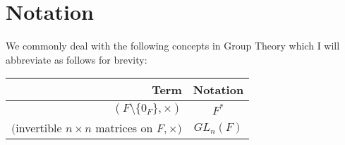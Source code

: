 \section{Notation}

We commonly deal with the following concepts in Group Theory
which I will abbreviate as follows for brevity:
\begin{center}
    \begin{tabular}{ | r | c | }
        \hline
        Term & Notation \\
        \hline \hline
        $(F \setminus \{0_F\}, \times)$ & $F^*$ \\
        $($invertible $n \times n$ matrices on $F$,$\,\times)$ & $GL_n(F)$ \\
        \hline
    \end{tabular}
\end{center}